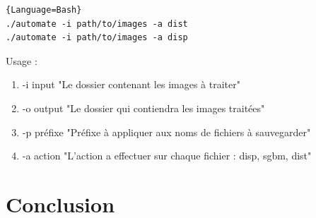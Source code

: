 \documentclass[12pt,a4paper]{report}
\begin{document}
\begin{lstlisting}{Language=Bash}
./automate -i path/to/images -a dist
./automate -i path/to/images -a disp
\end{lstlisting}

Usage :
\begin{enumerate}
\item[] -i input "Le dossier contenant les images à traiter"
\item[] -o output "Le dossier qui contiendra les images traitées"
\item[] -p préfixe "Préfixe à appliquer aux noms de fichiers à sauvegarder"
\item[] -a action "L'action a effectuer sur chaque fichier : disp, sgbm, dist"
\end{enumerate}

\chapter{Conclusion}
\end{document}
